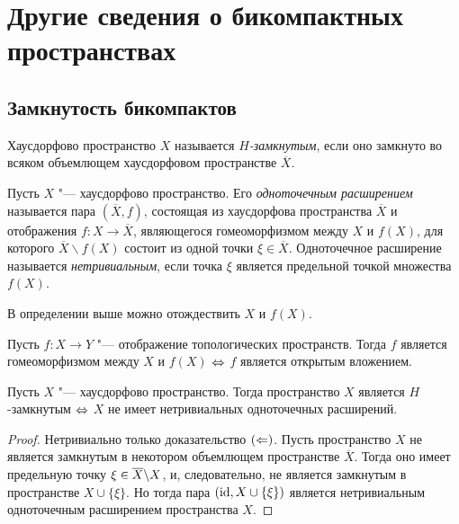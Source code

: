 \section{Другие сведения о бикомпактных пространствах}

\subsection{Замкнутость бикомпактов}

\begin{definition}
    Хаусдорфово пространство $X$ называется \textit{$H$-замкнутым}, если оно замкнуто во всяком объемлющем хаусдорфовом пространстве $\overline{X}$.
\end{definition}

\begin{definition}
    Пусть $X$ "--- хаусдорфово пространство. Его \textit{одноточечным расширением} называется пара $(\overline{X}, f)$, состоящая из хаусдорфова пространства $\overline{X}$ и отображения $f: X \rightarrow \overline{X}$, являющегося гомеоморфизмом между $X$ и $f(X)$, для которого $\overline{X} \backslash f(X)$ состоит из одной точки $\xi \in \overline X$. Одноточечное расширение называется \textit{нетривиальным}, если точка $\xi$ является предельной точкой множества $f(X)$.
\end{definition}

\begin{note}
    В определении выше можно отождествить $X$ и $f(X)$.
\end{note}

\begin{note}
    Пусть $f : X \to Y$ "--- отображение топологических пространств. Тогда $f$ является гомеоморфизмом между $X$ и $f(X)$ $\Leftrightarrow$ $f$ является открытым вложением.
\end{note}

\begin{proposition}
    Пусть $X$ "--- хаусдорфово пространство. Тогда пространство $X$ является $H$-замкну\-тым $\Leftrightarrow$ $X$ не имеет нетривиальных одноточечных расширений.
\end{proposition}

\begin{proof}
    Нетривиально только доказательство $(\Leftarrow)$. Пусть пространство $X$ не является замкнутым в некотором объемлющем пространстве $\overline X$. Тогда оно имеет предельную точку $\xi \in \overline X \backslash X$, и, следовательно, не является замкнутым в пространстве $X \cup \{\xi\}$. Но тогда пара $(\mathrm{id}, X \cup \{\xi\})$ является нетривиальным одноточечным расширением пространства $X$.
\end{proof}

